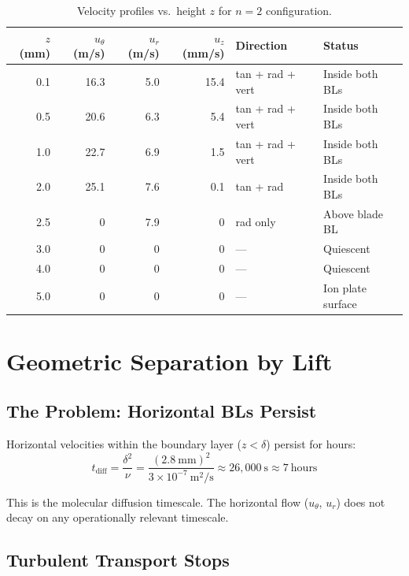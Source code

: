 \documentclass[11pt,a4paper]{article}
\begin{document}
\begin{table}[H]
\centering
\caption{Velocity profiles vs.\ height $z$ for $n = 2$ configuration.}
\begin{tabular}{rrrrll}
\toprule
$z$ (mm) & $u_\theta$ (m/s) & $u_r$ (m/s) & $u_z$ (mm/s) & Direction & Status \\
\midrule
0.1 & 16.3 & 5.0 & 15.4 & tan + rad + vert & Inside both BLs \\
0.5 & 20.6 & 6.3 & 5.4 & tan + rad + vert & Inside both BLs \\
1.0 & 22.7 & 6.9 & 1.5 & tan + rad + vert & Inside both BLs \\
2.0 & 25.1 & 7.6 & 0.1 & tan + rad & Inside both BLs \\
2.5 & 0 & 7.9 & 0 & rad only & Above blade BL \\
3.0 & 0 & 0 & 0 & --- & Quiescent \\
4.0 & 0 & 0 & 0 & --- & Quiescent \\
5.0 & 0 & 0 & 0 & --- & Ion plate surface \\
\bottomrule
\end{tabular}
\end{table}


\section{Geometric Separation by Lift}
\label{sec:separation}

\subsection{The Problem: Horizontal BLs Persist}

Horizontal velocities within the boundary layer ($z < \delta$) persist for hours:
\begin{equation}
  t_\mathrm{diff} = \frac{\delta^2}{\nu} = \frac{(2.8~\text{mm})^2}{3 \times 10^{-7}~\text{m}^2/\text{s}}
    \approx 26{,}000~\text{s} \approx 7~\text{hours}
\end{equation}

This is the molecular diffusion timescale. The horizontal flow ($u_\theta$, $u_r$)
does not decay on any operationally relevant timescale.

\subsection{Turbulent Transport Stops}
\end{document}
